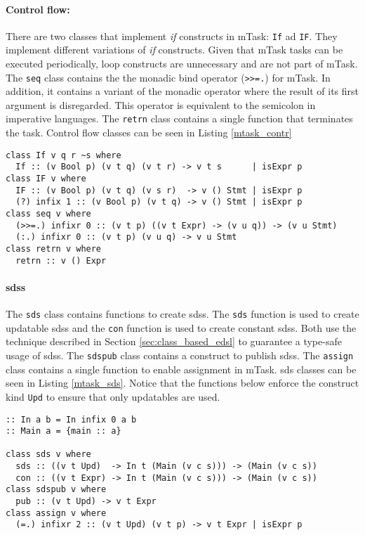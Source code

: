 \paragraph{Control flow:} There are two classes that implement \textit{if} constructs in mTask: \texttt{If} ad \texttt{IF}. They implement different variations of \textit{if} constructs. Given that mTask tasks can be executed periodically, loop constructs are unnecessary and are not part of mTask. The \texttt{seq} class contains the the monadic bind operator (\texttt{>>=.}) for mTask. In addition, it contains a variant of the monadic operator where the result of its first argument is disregarded. This operator is equivalent to the semicolon in imperative languages. The \texttt{retrn} class contains a single function that terminates the task. Control flow classes can be seen in Listing \ref{mtask_contr}

\begin{lstlisting}[caption=mTask control flow classes,captionpos=b,label=mtask_contr]
class If v q r ~s where
  If :: (v Bool p) (v t q) (v t r) -> v t s      | isExpr p 
class IF v where
  IF :: (v Bool p) (v t q) (v s r)  -> v () Stmt | isExpr p
  (?) infix 1 :: (v Bool p) (v t q) -> v () Stmt | isExpr p
class seq v where
  (>>=.) infixr 0 :: (v t p) ((v t Expr) -> (v u q)) -> (v u Stmt) 
  (:.) infixr 0 :: (v t p) (v u q) -> v u Stmt 
class retrn v where
  retrn :: v () Expr
\end{lstlisting}

\paragraph{\aclp{sds}} The \texttt{sds} class contains functions to create \aclp{sds}. The \texttt{sds} function is used to create updatable \acp{sds} and the \texttt{con} function is used to create constant \acp{sds}. Both use the technique described in Section \ref{sec:class_based_edsl} to guarantee a type-safe usage of \acp{sds}. The \texttt{sdspub} class contains a construct to publish \acp{sds}. The \texttt{assign} class contains a single function to enable assignment in mTask. \ac{sds} classes can be seen in Listing \ref{mtask_sds}. Notice that the functions below enforce the construct kind \texttt{Upd} to ensure that only updatables are used.

\begin{lstlisting}[caption=mTask SDS classes,captionpos=b,label=mtask_sds]
:: In a b = In infix 0 a b
:: Main a = {main :: a}

class sds v where
  sds :: ((v t Upd)  -> In t (Main (v c s))) -> (Main (v c s))
  con :: ((v t Expr) -> In t (Main (v c s))) -> (Main (v c s)) 
class sdspub v where
  pub :: (v t Upd) -> v t Expr
class assign v where
  (=.) infixr 2 :: (v t Upd) (v t p) -> v t Expr | isExpr p
\end{lstlisting}

